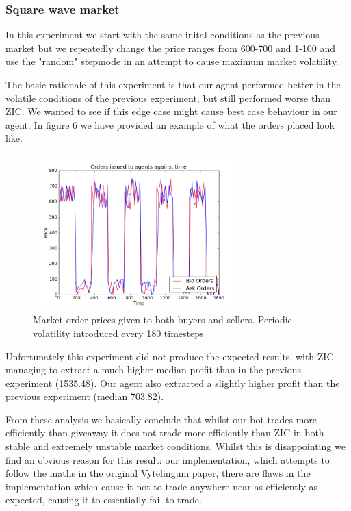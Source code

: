 \documentclass{acm_proc_article-sp}
\begin{document}
\subsubsection{Square wave market}

In this experiment we start with the same inital conditions as the previous
market but we repeatedly change the price ranges from 600-700 and 1-100 and use
the "random" stepmode in an attempt to cause maximum market volatility.

The basic rationale of this experiment is that our agent performed better in
the volatile conditions of the previous experiment, but still performed worse
than ZIC. We wanted to see if this edge case might cause best case behaviour in
our agent. In figure 6 we have provided an example of what the orders placed look
like.

\begin{figure}[h!] \includegraphics[width=80mm]{squarewave.png} \caption{Market
order prices given to both buyers and sellers. Periodic volatility introduced
every 180 timesteps} \end{figure}

Unfortunately this experiment did not produce the expected results, with ZIC
managing to extract a much higher median profit than in the previous experiment
(1535.48). Our agent also extracted a slightly higher profit than the previous
experiment (median 703.82).

From these analysis we basically conclude that whilst our bot trades more
efficiently than giveaway it does not trade more efficiently than ZIC in both
stable and extremely unstable market conditions. Whilst this is disappointing
we find an obvious reason for this result: our implementation, which attempts
to follow the maths in the original Vytelingum\cite{Vytellingum:AA} paper,
there are flaws in the implementation which cause it not to trade anywhere near
as efficiently as expected, causing it to essentially fail to trade.
\end{document}
